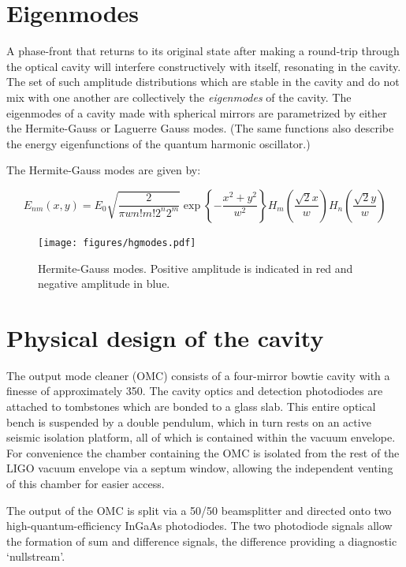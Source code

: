 \section{Eigenmodes}

A phase-front that returns to its original state after making a
round-trip through the optical cavity will interfere constructively
with itself, resonating in the cavity.  The set of such amplitude
distributions which are stable in the cavity and do not mix with one
another are collectively the \emph{eigenmodes} of the cavity.  The
eigenmodes of a cavity made with spherical mirrors are parametrized by
either the Hermite-Gauss or Laguerre Gauss modes.  (The same functions
also describe the energy eigenfunctions of the quantum harmonic
oscillator.)

The Hermite-Gauss modes are given by:

\begin{equation}
E_{nm}(x,y) = E_0 
\sqrt{ 
  \frac{2}{\pi w n! m! 2^n 2^m}
}
\exp \left\{-\frac{x^2+y^2}{w^2}\right\}
H_m\left( \frac{\sqrt{2}x}{w} \right)
H_n\left( \frac{\sqrt{2}y}{w} \right)
\end{equation}

\begin{figure}
\texttt{[image: figures/hgmodes.pdf]}
\caption[Hermite-Gauss TEM modes]{Hermite-Gauss modes. Positive amplitude is indicated in red and negative amplitude in blue.}
\end{figure}


\section{Physical design of the cavity}

The output mode cleaner (OMC) consists of a four-mirror bowtie cavity
with a finesse of approximately 350. The cavity optics and detection
photodiodes are attached to tombstones which are bonded to a glass
slab. This entire optical bench is suspended by a double pendulum,
which in turn rests on an active seismic isolation platform, all of
which is contained within the vacuum envelope. For convenience the
chamber containing the OMC is isolated from the rest of the LIGO vacuum
envelope via a septum window, allowing the independent venting of
this chamber for easier access.

The output of the OMC is split via a 50/50 beamsplitter and directed
onto two high-quantum-efficiency InGaAs photodiodes. The two photodiode
signals allow the formation of sum and difference signals, the difference
providing a diagnostic `nullstream'.

